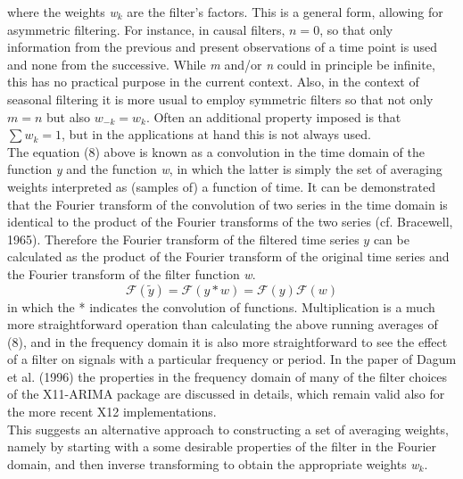 \documentclass{article}
\begin{document}
where the weights \textit{w$_k$} are the filter’s factors. This is a general form, allowing for asymmetric filtering. For instance, in causal filters, $n=0$, so that only information from the previous and present observations of a time point is used and none from the successive. While \textit{m} and/or \textit{n} could in principle be infinite, this has no practical purpose in the current context. Also, in the context of seasonal filtering it is more usual to employ symmetric filters so that not only $m=n$ but also $w_{-k} = w_k$. Often an additional property imposed is that $\sum w_k = 1$, but in the applications at hand this is not always used. \\ The equation (8) above is known as a convolution in the time domain of the function \textit{y} and the function \textit{w}, in which the latter is simply the set of averaging weights interpreted as (samples of) a function of time. It can be demonstrated that the Fourier transform of the convolution of two series in the time domain is identical to the product of the Fourier transforms of the two series (cf. Bracewell, 1965). Therefore the Fourier transform of the filtered time series $\textit{\~ y}$ can be calculated as the product of the Fourier transform of the original time series and the Fourier transform of the filter function \textit{w}.
\begin{equation}
\mathcal{F}(\tilde {y}) = \mathcal{F}(y * w) = \mathcal{F}(y)\mathcal{F}(w)
\end{equation}
in which the * indicates the convolution of functions. Multiplication is a much more straightforward operation than calculating the above running averages of (8), and in the frequency domain it is also more straightforward to see the effect of a filter on signals with a particular frequency or period. In the paper of Dagum et al. (1996) the properties in the frequency domain of many of the filter choices of the X11-ARIMA package are discussed in details, which remain valid also for the more recent X12 implementations.\\ This suggests an alternative approach to constructing a set of averaging weights, namely by starting with a some desirable properties of the filter in the Fourier domain, and then inverse transforming to obtain the appropriate weights \textit{w$_k$}.
\end{document}
